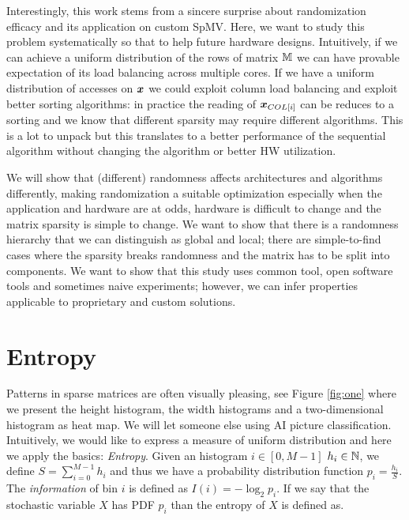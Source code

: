 \documentclass[manuscript,screen]{acmart}
\begin{document}
Interestingly, this work stems from a sincere surprise about
randomization efficacy and its application on custom SpMV. Here, we
want to study this problem systematically so that to help future
hardware designs. Intuitively, if we can achieve a uniform
distribution of the rows of matrix $\mathbb{M}$ we can have provable
expectation of its load balancing across multiple cores. If we have a
uniform distribution of accesses on ${\boldsymbol x}$ we could exploit column
load balancing and exploit better sorting algorithms: in practice the
reading of ${\boldsymbol x}_{COL[i]}$ can be reduces to a sorting and we know
that different sparsity may require different algorithms. This is a
lot to unpack but this translates to a better performance of the
sequential algorithm without changing the algorithm or better HW
utilization.


We will show that (different) randomness affects architectures and
algorithms differently, making randomization a suitable optimization
especially when the application and hardware are at odds, hardware is
difficult to change and the matrix sparsity is simple to change. We
want to show that there is a randomness hierarchy that we can
distinguish as global and local; there are simple-to-find cases where
the sparsity breaks randomness and the matrix has to be split into
components.  We want to show that this study uses common tool, open
software tools and sometimes naive experiments; however, we can infer
properties applicable to proprietary and custom solutions.

\newpage 
{}

\section{Entropy}
\label{sec:entropy}
Patterns in sparse matrices are often visually pleasing, see Figure
\ref{fig:one} where we present the height histogram, the width
histograms and a two-dimensional histogram as heat map. We will let
someone else using AI picture classification. Intuitively, we would
like to express a measure of uniform distribution and here we apply
the basics: {\em Entropy}. Given an histogram $i\in[0,M-1]$ $h_i \in
\mathbb{N}$, we define $S =\sum_{i=0}^{M-1}h_i$ and thus we have a probability
distribution function $p_i = \frac{h_i}{S}$. The {\em information} of
bin $i$ is defined as $I(i) = -\log_2 p_i$. If we say that the
stochastic variable $X$ has PDF $p_i$ than the entropy of $X$ is
defined as.
\end{document}
